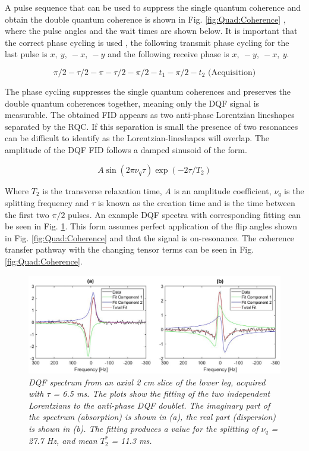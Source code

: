 A pulse sequence that can be used to suppress the single quantum coherence and obtain the double quantum coherence is shown in Fig. \ref{fig:Quad:Coherence} \cite{Sharf1995DetectionNMR-Spectroscopy}, where the pulse angles and the wait times are shown below. It is important that the correct phase cycling is used \cite{Bodenhausen1984SelectionExperiments}, the following transmit phase cycling for the last pulse is $x,\:y,\:-x,\:-y$ and the following receive phase is $x,\:-y,\:-x,\:y$. 

\begin{equation}
    \pi/2-\tau/2-\pi-\tau/2-\pi/2-t_1-\pi/2-t_2 \textrm{ (Acquisition)}
    \label{eqn:Quad:Pulse}
\end{equation}

The phase cycling suppresses the single quantum coherences and preserves the double quantum coherences together, meaning only the \ac{DQF} signal is measurable. The obtained FID appears as two anti-phase Lorentzian lineshapes separated by the \ac{RQC}. If this separation is small the presence of two resonances can be difficult to identify as the Lorentzian-lineshapes will overlap. The amplitude of the \ac{DQF} FID follows a damped sinusoid of the form. 

\begin{equation}
    A\sin(2\pi\nu_q\tau)\exp(-2\tau/T_2)
    \label{eqn:Quad:Amplitude}
\end{equation}

Where $T_2$ is the transverse relaxation time, $A$ is an amplitude coefficient, $\nu_q$ is the splitting frequency and $\tau$ is known as the creation time and is the time between the first two $\pi/2$ pulses. An example \ac{DQF} spectra with corresponding fitting can be seen in Fig. \ref{fig:Quad:Ex_DQF}. This form assumes perfect application of the flip angles shown in Fig. \ref{fig:Quad:Coherence} and that the signal is on-resonance. The coherence transfer pathway with the changing tensor terms can be seen in Fig. \ref{fig:Quad:Coherence}.

\begin{figure}
    \centering
    \includegraphics[width=1\textwidth]{Figures/Quad/Example_DQF.png}
    \caption{\textit{\ac{DQF} spectrum from an axial 2 cm slice of the lower leg, acquired with $\tau$ = 6.5 ms. The plots show the fitting of the two independent Lorentzians to the anti-phase \ac{DQF} doublet. The imaginary part of the spectrum (absorption) is shown in (a), the real part (dispersion) is shown in (b). The fitting produces a value for the splitting of $\nu_q$ = 27.7 Hz, and mean $T_2^*$ = 11.3 ms.}}
    \label{fig:Quad:Ex_DQF}
\end{figure}

